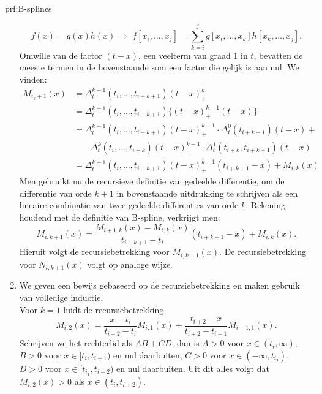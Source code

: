 \begin{prf}[B-splines]{prf:B-splines}
\begin{enumerate}
            \begin{equation*}
                f(x) = g(x)h(x) \ \Rightarrow \ f[x_i,\ldots,x_j] = \sum_{k=i}^{j} g[x_i,\ldots,x_k]h[x_k,\ldots,x_j].
            \end{equation*}
            Omwille van de factor $(t-x)$, een veelterm van graad 1 in $t$, bevatten de meeste termen in de bovenstaande som een factor die gelijk is aan nul. We vinden:
            \begin{align*}
                M_{i_k+1}(x) 
                    &= \Delta_t^{k+1}(t_i,\ldots,t_{i+k+1}) (t-x)^k_+ \\
                    &= \Delta_t^{k+1}(t_i,\ldots,t_{i+k+1}) \{(t-x)^{k-1}_+ (t-x)\} \\
                    &= \Delta_t^{k+1}(t_i,\ldots,t_{i+k+1}) (t-x)^{k-1}_+ \cdot \Delta^0_t(t_{i+k+1})(t-x) + \\ 
                    &   \quad \quad \Delta_t^{k}(t_i,\ldots,t_{i+k})(t-x)^{k-1}_+ \cdot \Delta^1_t(t_{i+k},t_{i+k+1})(t-x) \\
                    &= \Delta_t^{k+1}(t_i,\ldots,t_{i+k+1}) (t-x)^{k-1}_+(t_{i+k+1}-x) + M_{i,k}(x) 
            \end{align*}
            Men gebruikt nu de recursieve definitie van gedeelde differentie, om de differentie van orde $k+1$ in bovenstaande uitdrukking te schrijven als een lineaire combinatie van twee gedeelde differenties van orde $k$. Rekening houdend met de definitie van B-spline, verkrijgt men:
            \begin{equation*}
                M_{i,k+1}(x) =  \frac{M_{i+1,k}(x) - M_{i,k}(x)}{t_{i+k+1}-t_i}(t_{i+k+1}-x) + M_{i,k}(x).
            \end{equation*}
            Hieruit volgt de recursiebetrekking voor $M_{i,k+1}(x)$. De recursiebetrekking voor $N_{i,k+1}(x)$ volgt op analoge wijze.
        \item 
            We geven een bewijs gebaseerd op de recursiebetrekking en maken gebruik van volledige inductie. \\ 
            
            Voor $k=1$ luidt de recursiebetrekking
            \begin{equation*}
                M_{i,2}(x) = \frac{x-t_i}{t_{i+2}-t_i} M_{i,1}(x) + \frac{t_{i+2}-x}{t_{i+2}-t_{i+1}} M_{i+1,1}(x).
            \end{equation*}
            Schrijven we het rechterlid als $AB + CD$, dan is $A >0$ voor $x \in (t_i,\infty)$, $B>0$ voor $x\in [t_i,t_{i+1})$ en nul daarbuiten, $C>0$ voor $x \in (-\infty,t_{i_2})$, $D>0$ voor $x\in [t_{i_1},t_{i+2})$ en nul daarbuiten. Uit dit alles volgt dat $M_{i,2}(x) >0$ als $x \in (t_i,t_{i+2})$.  \\


\end{enumerate}
\end{prf}
